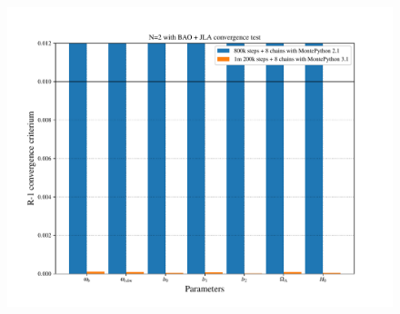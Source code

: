 \documentclass[a4paper,10pt]{article}
\begin{document}
\begin{figure}[h]
 \centering
 \includegraphics[scale=0.8]{plot_convergence_baojla_N=2.pdf}
\end{figure}
\end{document}
